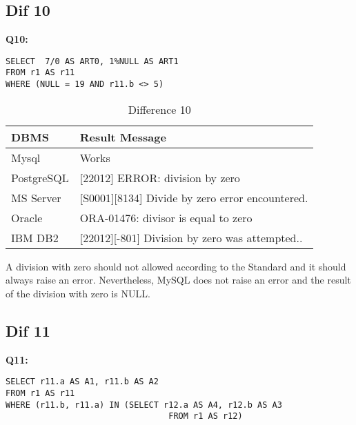  
\subsection{Dif 10}
  
\textbf{Q10:}
\begin{mdframed}[backgroundcolor=lightgray!20]
\begin{lstlisting}[style=SQL]
SELECT  7/0 AS ART0, 1%NULL AS ART1
FROM r1 AS r11
WHERE (NULL = 19 AND r11.b <> 5)   
\end{lstlisting}
\end{mdframed}
  
\begin{table}[h]
\centering
\caption{Difference 10}
\label{my-label}
\begin{tabular}
{|p{2cm}|p{11.5cm}| }
\hline
\textbf{DBMS} & \textbf{Result Message}                                 \\ \hline
Mysql         & Works                                                   \\ \hline
PostgreSQL    & {[}22012{]} ERROR: division by zero                     \\ \hline
MS Server     & {[}S0001{]}{[}8134{]} Divide by zero error encountered. \\ \hline
Oracle        & ORA-01476: divisor is equal to zero                     \\ \hline
IBM DB2       & {[}22012{]}{[}-801{]} Division by zero was attempted..  \\ \hline
\end{tabular}
\end{table}

A division with zero should not allowed  according to the Standard and it should  always raise an error. Nevertheless, MySQL does not raise an error and the result of the division with zero is NULL. 


 
\subsection{Dif 11}

\textbf{Q11:}
\begin{mdframed}[backgroundcolor=lightgray!20]
\begin{lstlisting}[style=SQL]
SELECT r11.a AS A1, r11.b AS A2
FROM r1 AS r11
WHERE (r11.b, r11.a) IN (SELECT r12.a AS A4, r12.b AS A3
                         		 FROM r1 AS r12)
\end{lstlisting}
\end{mdframed}

